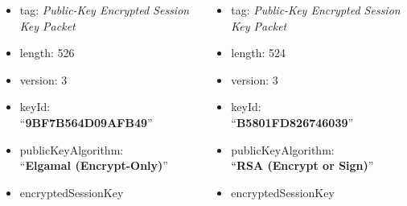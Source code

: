 \documentclass{beamer}
\begin{document}

\begin{frame}

	
	
\end{frame}


\tiny
\begin{frame}

	\begin{columns}[t]
		\begin{column}[t]{0.5\paperwidth} \footnotesize
		\vspace{1em}
			\begin{itemize}
				\item tag: \textit{Public-Key Encrypted Session Key Packet}
				\item length: 526
				\item version: 3
				\item keyId: \\ ``\textbf{9BF7B564D09AFB49}''
				\item publicKeyAlgorithm: \\ ``\textbf{Elgamal (Encrypt-Only)}''
				\item encryptedSessionKey
			\end{itemize}

		\end{column}
		\begin{column}[t]{0.5\paperwidth} \footnotesize
			\begin{itemize}
				\item tag: \textit{Public-Key Encrypted Session Key Packet}
				\item length: 524
				\item version: 3
				\item keyId: \\ ``\textbf{B5801FD826746039}''
				\item publicKeyAlgorithm:\\ ``\textbf{RSA (Encrypt or Sign)}''
				\item encryptedSessionKey
			\end{itemize}
			
		\end{column}
	\end{columns}
	\vspace{2em}
	

\end{frame}
\end{document}
